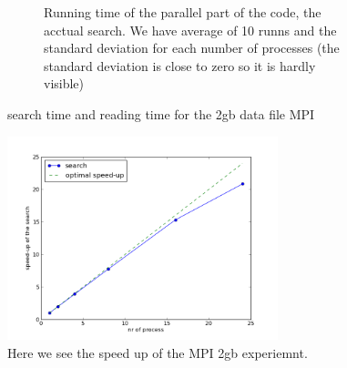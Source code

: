 \documentclass[a4paper,10pt]{article}
\begin{document}
\begin{figure}[h!t]
\begin{subfigure}[b]{0.70\textwidth}
                \caption{Running time of the parallel part of the code, the acctual search. 
                         We have average of 10 runns and the standard deviation for each number
                         of processes (the standard deviation is close to zero so it is hardly 
                         visible)}
                \label{fig:mpio2_search}
        \end{subfigure}
        \caption{search time and reading time for the 2gb data file MPI}
\end{figure}

\begin{figure}[htb]
  \centering
  \includegraphics[width=0.7\textwidth]{graphics/mpio2gb_take2/search_speedup.png}
  \caption{Here we see the speed up of the MPI 2gb experiemnt.}
  \label{fig:mpio2_speedup}
\end{figure}
\end{document}
